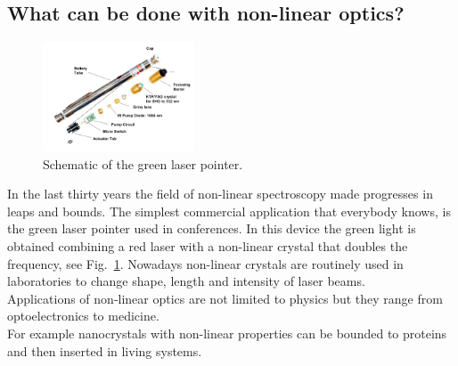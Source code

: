 \subsection{What can be done with non-linear optics?} 
\begin{figure}
  \begin{center}
    \includegraphics[width=0.4\textwidth]{Figures/lasergreen}
  \end{center}
  \caption{Schematic of the green laser pointer. \label{greenlaser}}
\end{figure}
In the last thirty years the field of non-linear spectroscopy\cite{bloembergen1982nonlinear} made progresses in leaps and bounds. The simplest commercial application that everybody knows, is the green laser pointer used in conferences. In this device the green light is obtained combining a red laser with a non-linear crystal that doubles the frequency, see Fig.~\ref{greenlaser}. Nowadays non-linear crystals are routinely used in laboratories to change shape, length and intensity of laser beams. \\
        Applications of non-linear optics are not limited to physics but they range from optoelectronics to medicine. \\
        For example nanocrystals with non-linear properties can be bounded to proteins and then inserted in living systems.

